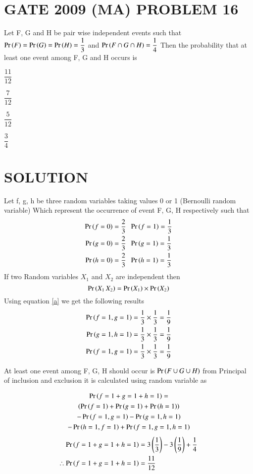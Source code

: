 \documentclass[journal,12pt,twocolumn]{IEEEtran}
\begin{document}
\section{GATE 2009 (MA) PROBLEM 16} 
Let F, G and H be pair wise independent events such that $\Pr\left(F\right)=\Pr\left(G\right)=\Pr\left(H\right)=\dfrac{1}{3}$ 
and $\Pr\left(F \cap G \cap H\right)=\dfrac{1}{4}$ Then the probability that at least one event among F, G and H occurs is 
\begin{enumerate}[(A)]
\begin{multicols}{4}
\setlength\itemsep{2em}
\item $\dfrac{11}{12}$
\item $\dfrac{7}{12}$
\item $\dfrac{5}{12}$
\item $\dfrac{3}{4}$
\end{multicols}
\end{enumerate}

\section{SOLUTION}
Let f, g, h be three random variables taking values 0 or 1 (Bernoulli random variable) Which 
represent the occurrence of event F, G, H respectively such that 
\begin{align*}
\Pr\left(f=0\right) = \dfrac{2}{3}\;&\;\Pr\left(f=1\right) = \dfrac{1}{3} \\
\Pr\left(g=0\right) = \dfrac{2}{3}\;&\;\Pr\left(g=1\right) = \dfrac{1}{3} \\
\Pr\left(h=0\right) = \dfrac{2}{3}\;&\;\Pr\left(h=1\right) = \dfrac{1}{3} \\
\end{align*}
If two Random variables $X_1$ and $X_2$ are independent then 
\begin{equation}
\Pr\left(X_1\,X_2\right) = \Pr\left(X_1\right) \times \Pr\left(X_2\right) \label{a}
\end{equation}
Using equation \eqref{a} we get the following results 
\begin{align*}
\Pr\left(f=1,g=1\right) &= \dfrac{1}{3} \times \dfrac{1}{3} = \dfrac{1}{9} \\
\Pr\left(g=1,h=1\right) &= \dfrac{1}{3} \times \dfrac{1}{3} = \dfrac{1}{9} \\
\Pr\left(f=1,g=1\right) &= \dfrac{1}{3} \times \dfrac{1}{3} = \dfrac{1}{9} 
\end{align*}

At least one event among F, G, H should occur is $\Pr\left(F\cup G\cup H\right)$ 
from Principal of inclusion and exclusion it is calculated using random variable as

\begin{multline*}
\Pr\left(f=1 + g=1 + h=1\right) =  \\
\left(\Pr\left(f=1\right) + \Pr\left(g=1\right) + \Pr\left(h=1\right)\right) \\
- \Pr\left(f=1,g=1\right) - \Pr\left(g=1,h=1\right) \\
 - \Pr\left(h=1,f=1\right) + \Pr\left(f=1,g=1,h=1\right)
\end{multline*}
\begin{align*}
\Pr\left(f=1 + g=1 + h=1\right) &= 3\left(\dfrac{1}{3}\right) - 3\left(\dfrac{1}{9}\right) + \dfrac{1}{4} \\
\therefore \Pr\left(f=1 + g=1 + h=1\right) &= \dfrac{11}{12}
\end{align*}
\end{document}
